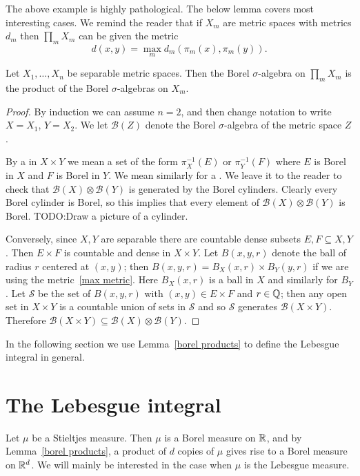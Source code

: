 The above example is highly pathological.
The below lemma covers most interesting cases.
We remind the reader that if $X_{m}$ are metric spaces with metrics $d_{m}$ then $\prod_{m} X_{m}$ can be given the metric
\begin{equation}\label{max metric}
d(x, y) = \max_{m} d_{m}(\pi_{m}(x), \pi_{m}(y)).
\end{equation}

\begin{lemma}\label{borel products}
Let $X_{1}, \dots, X_{n}$ be separable metric spaces.
Then the Borel $\sigma$-algebra on $\prod_{m} X_{m}$ is the product of the Borel $\sigma$-algebras on $X_{m}$.
\end{lemma}
\begin{proof}
By induction we can assume $n = 2$, and then change notation to write $X = X_{1}$, $Y = X_{2}$. We let $\mathcal B(Z)$ denote the Borel $\sigma$-algebra of the metric space $Z$.

By a  in $X \times Y$ we mean a set of the form $\pi_{X}^{-1}(E)$ or $\pi_{Y}^{-1}(F)$ where $E$ is Borel in $X$ and $F$ is Borel in $Y$.
We mean similarly for a .
We leave it to the reader to check that $\mathcal B(X) \otimes \mathcal B(Y)$ is generated by the Borel cylinders.
Clearly every Borel cylinder is Borel, so this implies that every element of $\mathcal B(X) \otimes \mathcal B(Y)$ is Borel.
TODO:\@ Draw a picture of a cylinder.

Conversely, since $X, Y$ are separable there are countable dense subsets $E, F \subseteq X, Y$.
Then $E \times F$ is countable and dense in $X \times Y$.
Let $B(x, y, r)$ denote the ball of radius $r$ centered at $(x, y)$; then $B(x, y, r) = B_{X}(x, r) \times B_{Y}(y, r)$ if we are using the metric~\ref{max metric}. Here $B_{X}(x, r)$ is a ball in $X$ and similarly for $B_{Y}$.
Let $\mathcal S$ be the set of $B(x, y, r)$ with $(x, y) \in E \times F$ and $r \in \mathbb{Q}$; then any open set in $X \times Y$ is a countable union of sets in $\mathcal S$ and so $\mathcal S$ generates $\mathcal B(X \times Y)$.
Therefore $\mathcal B(X \times Y) \subseteq \mathcal B(X) \otimes \mathcal B(Y)$.
\end{proof}

In the following section we use Lemma~\ref{borel products} to define the Lebesgue integral in general.

\section{The Lebesgue integral}
Let $\mu$ be a Stieltjes measure.
Then $\mu$ is a Borel measure on $\mathbb{R}$, and by Lemma~\ref{borel products}, a product of $d$ copies of $\mu$ gives rise to a Borel measure on $\mathbb{R}^{d}$.
We will mainly be interested in the case when $\mu$ is the Lebesgue measure.

